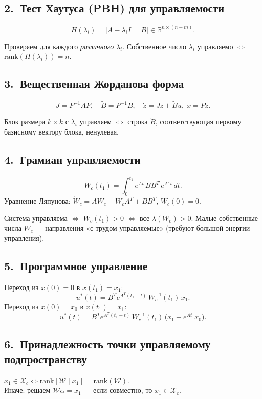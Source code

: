 \documentclass[12pt,a4paper]{article}
\begin{document}
	\subsection{2.~Тест Хаутуса (PBH) для управляемости}
	\begin{formulabox}
		\[
		H(\lambda_i) = \bigl[A - \lambda_i I \;\mid\; B\bigr] \in \mathbb{R}^{n \times (n+m)}.
		\]
	\end{formulabox}
	Проверяем для каждого \emph{различного} $\lambda_i$.
	Собственное число $\lambda_i$ управляемо $\Leftrightarrow$ $\mathrm{rank}(H(\lambda_i)) = n$.
	
	\subsection{3.~Вещественная Жорданова форма}
	\begin{formulabox}
		\[
		J = P^{-1}AP, \quad \tilde{B} = P^{-1}B, \quad \dot{z} = Jz + \tilde{B}u, \; x = Pz.
		\]
	\end{formulabox}
	Блок размера $k\!\times\!k$ с $\lambda_i$ управляем $\Leftrightarrow$ строка $\tilde{B}$,
	соответствующая первому базисному вектору блока, ненулевая.
	
	\subsection{4.~Грамиан управляемости}
	\begin{formulabox}
		\[
		W_c(t_1) = \int_0^{t_1} e^{At}\,BB^T\,e^{A^Tt}\,dt.
		\]
		Уравнение Ляпунова: $\dot{W}_c = AW_c + W_cA^T + BB^T$, $W_c(0)=0$.
	\end{formulabox}
	Система управляема $\Leftrightarrow$ $W_c(t_1) > 0$ $\Leftrightarrow$ все $\lambda(W_c) > 0$.
	Малые собственные числа $W_c$ --- направления «с трудом управляемые»
	(требуют большой энергии управления).
	
	\subsection{5.~Программное управление}
	\begin{formulabox}
		Переход из $x(0)=0$ в $x(t_1)=x_1$:
		\[
		u^*(t) = B^T e^{A^T(t_1-t)}\,W_c^{-1}(t_1)\,x_1.
		\]
		Переход из $x(0)=x_0$ в $x(t_1)=x_1$:
		\[
		u^*(t) = B^T e^{A^T(t_1-t)}\,W_c^{-1}(t_1)\,\bigl(x_1 - e^{At_1}x_0\bigr).
		\]
	\end{formulabox}
	
	\subsection{6.~Принадлежность точки управляемому подпространству}
	$x_1 \in \mathcal{X}_c \Longleftrightarrow \mathrm{rank}[\mathcal{W} \mid x_1] = \mathrm{rank}(\mathcal{W})$.\\
	Иначе: решаем $\mathcal{W}\alpha = x_1$ --- если совместно, то $x_1 \in \mathcal{X}_c$.
	
\end{document}
